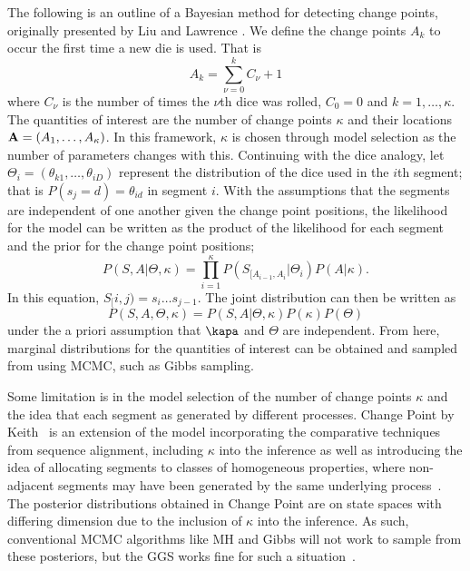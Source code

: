 The following is an outline of a Bayesian method for detecting change points, originally presented by Liu and Lawrence \cite{liu1999bayesian}. We define the change points $A_k$ to occur the first time a new die is used. That is
    \begin{equation}
        A_k = \sum_{\nu=0}^{k}C_\nu + 1
    \end{equation}
where $C_\nu$ is the number of times the $\nu$th dice was rolled, $C_0 = 0$ and $k = 1,\ldots,\kappa$. The quantities of interest are the number of change points $\kappa$ and their locations $\mathbf{A} = (A_1,\ldots,A_\kappa)$. In this framework, $\kappa$ is chosen through model selection as the number of parameters changes with this. Continuing with the dice analogy, let $\Theta_i = (\theta_{k1},\ldots,\theta_{iD})$ represent the distribution of the dice used in the $i$th segment; that is $P(s_j = d) = \theta_{id}$ in segment $i$. With the assumptions that the segments are independent of one another given the change point positions, the likelihood for the model can be written as the product of the likelihood for each segment and the prior for the change point positions;
    \begin{equation}
        P(S,A|\Theta, \kappa) = \prod_{i=1}^{\kappa} P(S_{[A_{i-1},A_{i}}|\Theta_i)P(A|\kappa).
    \end{equation}
In this equation, $S_[i,j) = s_i\ldots s_{j-1}$. The joint distribution can then be written as
    \begin{equation}
        P(S,A,\Theta,\kappa) =  P(S,A|\Theta, \kappa)P(\kappa)P(\Theta)
    \end{equation}
under the a priori assumption that $\kapa$ and $\Theta$ are independent. From here, marginal distributions for the quantities of interest can be obtained and sampled from using MCMC, such as Gibbs sampling. 

Some limitation is in the model selection of the number of change points $\kappa$ and the idea that each segment as generated by different processes. 
Change Point by Keith~\cite{keith2006segmenting} is an extension of the model incorporating the comparative techniques from sequence alignment, including $\kappa$ into the inference as well as introducing the idea of allocating segments to classes of homogeneous properties, where non-adjacent segments may have been generated by the same underlying process~\cite{oldmeadow2009multiple}. The posterior distributions obtained in Change Point are on state spaces with differing dimension due to the inclusion of $\kappa$ into the inference. As such, conventional MCMC algorithms like MH and Gibbs will not work to sample from these posteriors, but the GGS works fine for such a situation~\cite{keith2004generalized}.


